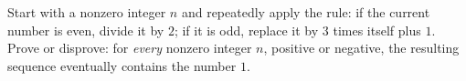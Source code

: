 Start with a nonzero integer $n$ and repeatedly apply the rule: if the current number is even, divide it by $2$; if it is odd, replace it by $3$ times itself plus $1$. Prove or disprove: for \emph{every} nonzero integer $n$, positive or negative, the resulting sequence eventually contains the number $1$.
